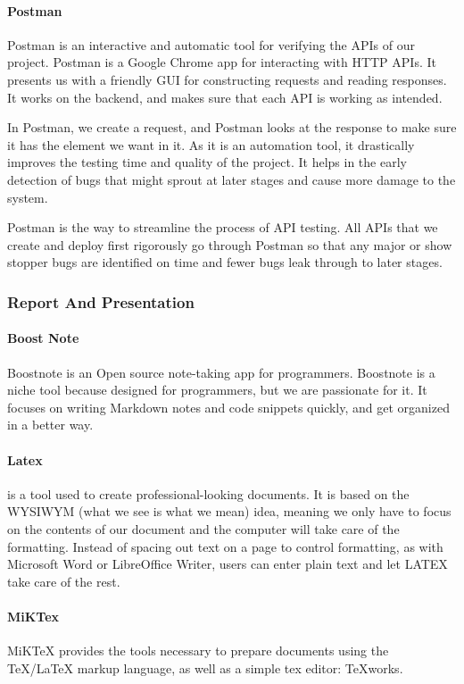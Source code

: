 \paragraph*{Postman}
Postman is an interactive and automatic tool for verifying the APIs of our project. Postman is a Google Chrome app for interacting with HTTP APIs. It presents us with a friendly GUI for constructing requests and reading responses. It works on the backend, and makes sure that each API is working as intended.

In Postman, we create a request, and Postman looks at the response to make sure it has the element we want in it. As it is an automation tool, it drastically improves the testing time and quality of the project. It helps in the early detection of bugs that might sprout at later stages and cause more damage to the system.

Postman is the way to streamline the process of API testing. All APIs that we create and deploy first rigorously go through Postman so that any major or show stopper bugs are identified on time and fewer bugs leak through to later stages.




\subsubsection{Report And Presentation}
\paragraph*{Boost Note}
Boostnote is an Open source note-taking app for programmers.
Boostnote is a niche tool because designed for programmers, but we are passionate for it.
It focuses on writing Markdown notes and code snippets quickly, and get organized in a better way.

\paragraph*{Latex}
\latex{} is a tool used to create professional-looking documents. It is based on the WYSIWYM (what we see is what we mean) idea, meaning we only have to focus on the contents of our document and the computer will take care of the formatting. Instead of spacing out text on a page to control formatting, as with Microsoft Word or LibreOffice Writer, users can enter plain text and let LATEX take care of the rest.
\paragraph*{MiKTex}
MiKTeX provides the tools necessary to prepare documents using the TeX/LaTeX markup language, as well as a simple tex editor: TeXworks.

